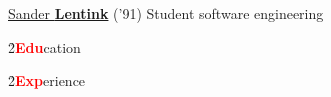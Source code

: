 \Huge \href{http://lent.ink}{Sander \textbf{Lentink}}
\large ('91) Student software engineering
\normalsize

\h{2}{\textbf{\textcolor{red}{Edu}}cation}{}


\h{2}{\textbf{\textcolor{red}{Exp}}erience}{}

